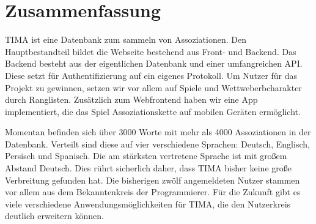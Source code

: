 \chapter{Zusammenfassung}
TIMA ist eine Datenbank zum sammeln von Assoziationen. Den Hauptbestandteil bildet die Webseite bestehend aus Front- und Backend. Das Backend besteht aus der eigentlichen Datenbank und einer umfangreichen API. Diese setzt für Authentifizierung auf ein eigenes Protokoll. Um Nutzer für das Projekt zu gewinnen, setzen wir vor allem auf Spiele und Wettweberbcharakter durch Ranglisten. Zusätzlich zum Webfrontend haben wir eine App implementiert, die das Spiel Assoziationskette auf mobilen Geräten ermöglicht.

Momentan befinden sich über 3000 Worte mit mehr als 4000 Assoziationen in der Datenbank. Verteilt sind diese auf vier verschiedene Sprachen: Deutsch, Englisch, Persisch und Spanisch. Die am stärksten vertretene Sprache ist mit großem Abstand Deutsch. Dies rührt sicherlich daher, dass TIMA bisher keine große Verbreitung gefunden hat. Die bisherigen zwölf angemeldeten Nutzer stammen vor allem aus dem Bekanntenkreis der Programmierer. Für die Zukunft gibt es viele verschiedene Anwendungsmöglichkeiten für TIMA, die den Nutzerkreis deutlich erweitern können.